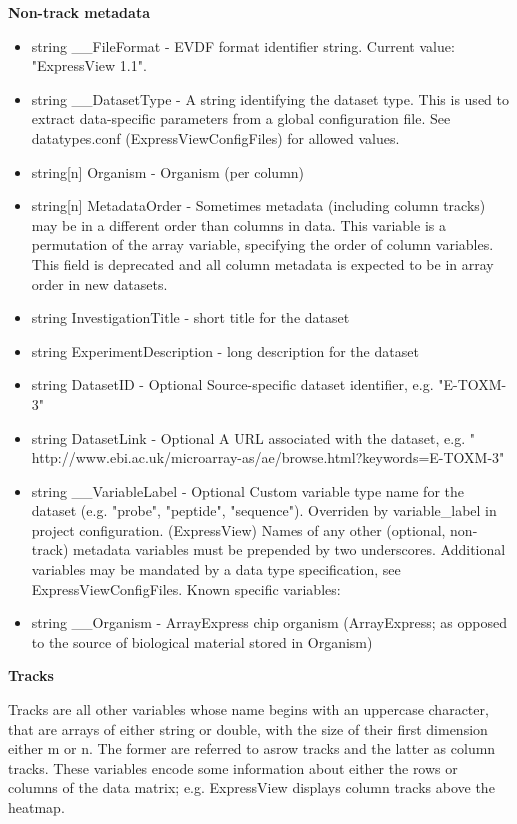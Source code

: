 \documentclass[12pt]{article}
\begin{document}
\textbf{Non-track metadata}
\begin{itemize}
  \item string __FileFormat - EVDF format identifier string. Current value: "ExpressView 1.1".
  \item string __DatasetType - A string identifying the dataset type. This is used to extract data-specific parameters from a global configuration file. See datatypes.conf (ExpressViewConfigFiles) for allowed values.
  \item string[n] Organism - Organism (per column)
  \item string[n] MetadataOrder - Sometimes metadata (including column tracks) may be in a different order than columns in data. This variable is a permutation of the array variable, specifying the order of column variables. This field is deprecated and all column metadata is expected to be in array order in new datasets.
  \item string InvestigationTitle - short title for the dataset
  \item string ExperimentDescription - long description for the dataset
  \item string DatasetID - Optional Source-specific dataset identifier, e.g. "E-TOXM-3"
  \item string DatasetLink - Optional A URL associated with the dataset, e.g. " http://www.ebi.ac.uk/microarray-as/ae/browse.html?keywords=E-TOXM-3"
  \item string __VariableLabel - Optional Custom variable type name for the dataset (e.g. "probe", "peptide", "sequence"). Overriden by variable_label in project configuration. (ExpressView)
Names of any other (optional, non-track) metadata variables must be prepended by two underscores. Additional variables may be mandated by a data type specification, see ExpressViewConfigFiles. Known specific variables:
  \item string __Organism - ArrayExpress chip organism (ArrayExpress; as opposed to the source of biological material stored in Organism)
\end{itemize}

\textbf{Tracks}

Tracks are all other variables whose name begins with an uppercase character, that are arrays of either string or double, with the size of their first dimension either m or n. The former are referred to asrow tracks and the latter as column tracks. These variables encode some information about either the rows or columns of the data matrix; e.g. ExpressView displays column tracks above the heatmap.
\end{document}
